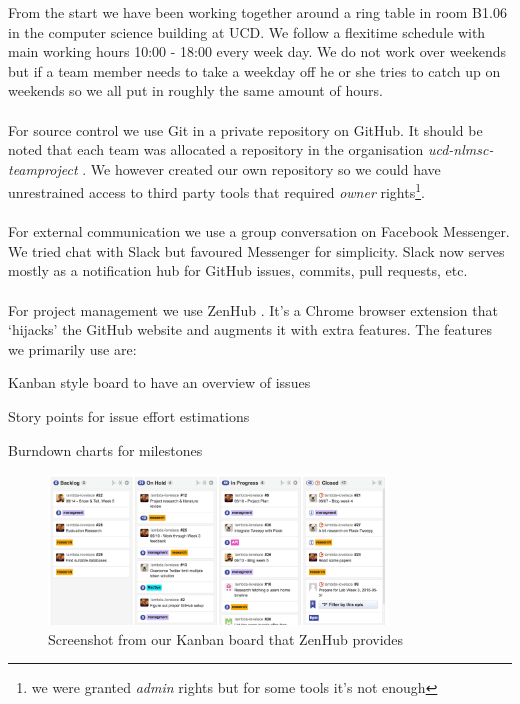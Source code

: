 \documentclass{article}
\begin{document}
From the start we have been working together around a ring table in room B1.06 in the computer science building at UCD. We follow a flexitime schedule with main working hours 10:00 - 18:00 every week day. We do not work over weekends but if a team member needs to take a weekday off he or she tries to catch up on weekends so we all put in roughly the same amount of hours.
\\\\
For source control we use Git in a private repository on GitHub. It should be noted that each team was allocated a repository in the organisation \linebreak \mbox{\textit{ucd-nlmsc-teamproject}} \cite{ucdgithub}. We however created our own repository \cite{gitrepo} so we could have unrestrained access to third party tools that required \textit{owner} rights\footnote{we were granted \textit{admin} rights but for some tools it's not enough}.
\\\\
For external communication we use a group conversation on Facebook Messenger. We tried chat with Slack  but favoured Messenger for simplicity. Slack now serves mostly as a notification hub for GitHub issues, commits, pull requests, etc.
\\\\
For project management we use ZenHub \cite{zenhub}. It's a Chrome browser extension that `hijacks' the GitHub website and augments it with extra features. The features we primarily use are:

\begin{samepage}
\begin{itemize*}
	\item Kanban style board to have an overview of issues
	\item Story points for issue effort estimations
	\item Burndown charts for milestones
\end{itemize*}
\end{samepage}


\begin{figure}[H]
    \centering
    \includegraphics[width=0.8\textwidth]{kanbanboard}  
    \caption{Screenshot from our Kanban board that ZenHub provides}
\end{figure}
\end{document}

